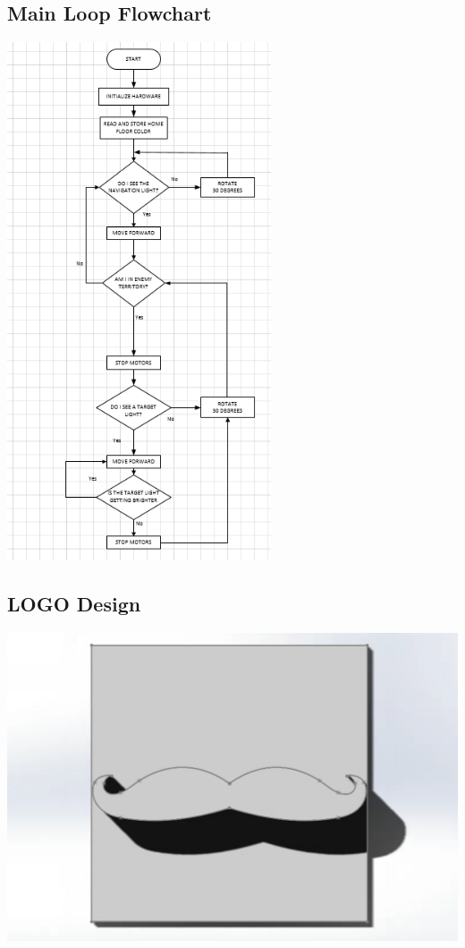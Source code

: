 \documentclass{article}
\begin{document}
\subsection{Main Loop Flowchart}
\begin{center}
\includegraphics[height=\textheight]{MainFlowchart.png}
\end{center}
\subsection{LOGO Design}
\includegraphics[width=\textwidth]{LOGO.png}
\end{document}
